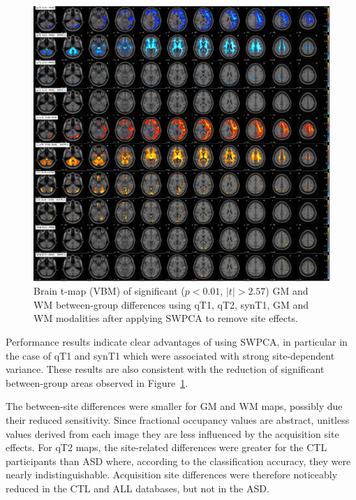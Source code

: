 \begin{figure}
	\centering
	\includegraphics[width=\linewidth]{Graphics/ch7/FIGURE03}
	\caption[Brain t-map (\acs{VBM}) of significant ($p<0.01$, $|t|>2.57$) \acs{GM} and \acs{WM} between-group differences using \acs{qT1}, \acs{qT2}, \acs{synT1}, \acs{GM} and \acs{WM} modalities after applying \acs{SWPCA} to remove site effects.]{Brain t-map (\ac{VBM}) of significant ($p<0.01$, $|t|>2.57$) \ac{GM} and \ac{WM} between-group differences using \ac{qT1}, \ac{qT2}, \ac{synT1}, \ac{GM} and \ac{WM} modalities after applying \ac{SWPCA} to remove site effects.}
	\label{fig:swpcaFIGURE03}
\end{figure}

Performance results indicate clear advantages of using \ac{SWPCA}, in particular in the case of \ac{qT1} and \ac{synT1} which were associated with strong site-dependent variance. These results are also consistent with the reduction of significant between-group areas observed in Figure~\ref{fig:swpcaFIGURE03}.
	
The between-site differences were smaller for \ac{GM} and \ac{WM} maps, possibly due their reduced sensitivity. Since fractional occupancy values are abstract, unitless values derived from each image they are less influenced by the acquisition site effects. For \ac{qT2} maps, the site-related differences were greater for the \ac{CTL} participants than \ac{ASD} where, according to the classification accuracy, they were nearly indistinguishable. Acquisition site differences were therefore noticeably reduced in the \ac{CTL} and ALL databases, but not in the \ac{ASD}.

